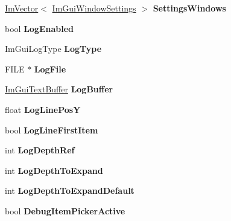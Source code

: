 \begin{DoxyCompactItemize}
\item 
\mbox{\label{structImGuiContext_a19273d7eb5a729463c042671ae27ca58}} 
\hyperlink{structImVector}{Im\+Vector}$<$ \hyperlink{structImGuiWindowSettings}{Im\+Gui\+Window\+Settings} $>$ {\bfseries Settings\+Windows}
\item 
\mbox{\label{structImGuiContext_a2508bec1862aa4477eca2c79d6924b82}} 
bool {\bfseries Log\+Enabled}
\item 
\mbox{\label{structImGuiContext_a832ec584c0e3558c15b342ac077515d5}} 
Im\+Gui\+Log\+Type {\bfseries Log\+Type}
\item 
\mbox{\label{structImGuiContext_a73a73a599720fb933e4fb5e673dde131}} 
F\+I\+LE $\ast$ {\bfseries Log\+File}
\item 
\mbox{\label{structImGuiContext_a7ee6cc4eb7d913073f7f65245f74b44b}} 
\hyperlink{structImGuiTextBuffer}{Im\+Gui\+Text\+Buffer} {\bfseries Log\+Buffer}
\item 
\mbox{\label{structImGuiContext_a8da8ba7ae9201ae085630a396d226244}} 
float {\bfseries Log\+Line\+PosY}
\item 
\mbox{\label{structImGuiContext_ab011a2f260e200403d6177bdccc3b20b}} 
bool {\bfseries Log\+Line\+First\+Item}
\item 
\mbox{\label{structImGuiContext_a56710f298126b4a30a9d45c433ec66be}} 
int {\bfseries Log\+Depth\+Ref}
\item 
\mbox{\label{structImGuiContext_a03a52c2f6ed034934140180049e1ad93}} 
int {\bfseries Log\+Depth\+To\+Expand}
\item 
\mbox{\label{structImGuiContext_a48b837ab4012447dde42bab75406abdd}} 
int {\bfseries Log\+Depth\+To\+Expand\+Default}
\item 
\mbox{\label{structImGuiContext_a166e3b48f51fc46f01145dbaf695ef4f}} 
bool {\bfseries Debug\+Item\+Picker\+Active}
\item 

\end{DoxyCompactItemize}
